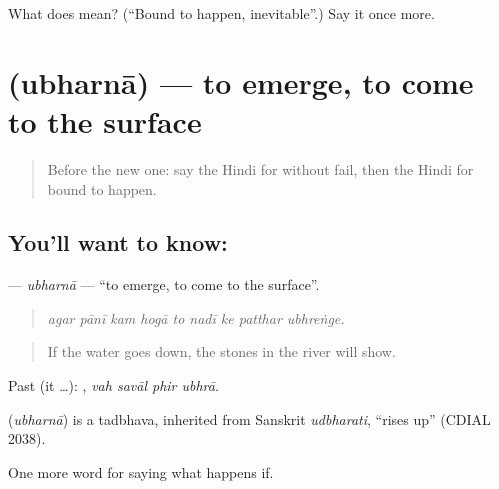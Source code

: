 \begin{tcolorbox}[breakable,colback=teal!4,colframe=teal!35!black,title={Before you move on}]
What does  mean? (\textquotedblleft{}Bound to happen, inevitable\textquotedblright{}.) Say it once more.
\end{tcolorbox}
\section[\texorpdfstring{\hi{उभरना} (ubharnā)}{उभरना (ubharnā)}]{ (ubharnā) — to emerge, to come to the surface}

\label{lesson:HI-C376-ubharna}



\begin{quote}
Before the new one: say the Hindi for without fail, then the Hindi for bound to happen.
\end{quote}

\subsection*{You'll want to know: }
\textbf{} — \emph{ubharnā} — \textquotedblleft{}to emerge, to come to the surface\textquotedblright{}.

\begin{quote}
        
\end{quote}

\begin{quote}
\emph{agar pānī kam hogā to nadī ke patthar ubhreṅge.}
\end{quote}

\begin{quote}
If the water goes down, the stones in the river will show.
\end{quote}

Past (it …):    , \emph{vah savāl phir ubhrā}.

\begin{cousinweb}
\textbf{} (\emph{ubharnā}) is a tadbhava, inherited from Sanskrit \emph{udbharati}, \textquotedblleft{}rises up\textquotedblright{} (CDIAL 2038).
\end{cousinweb}

\begin{grammarlens}[title={What you've built}]
One more word for saying what happens if.
\end{grammarlens}

